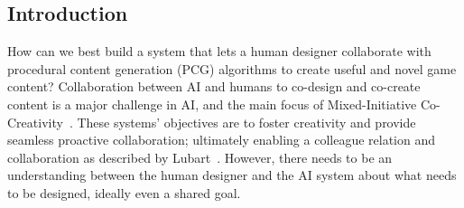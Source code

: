 \subsection{Introduction}




How can we best build a system that lets a human designer collaborate with procedural content generation (PCG) algorithms to create useful and novel game content? Collaboration between AI and humans to co-design and co-create content is a major challenge in AI, and the main focus of Mixed-Initiative Co-Creativity~. These systems' objectives are to foster creativity and provide seamless proactive collaboration; ultimately enabling a colleague relation and collaboration as described by Lubart~. However, there needs to be an understanding between the human designer and the AI system about what needs to be designed, ideally even a shared goal.



